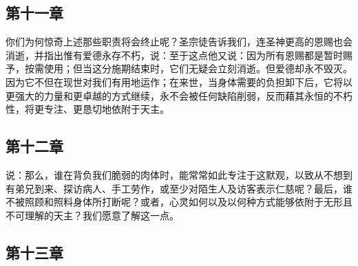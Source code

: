 
\subsection{第十一章}

\par

你们为何惊奇上述那些职责将会终止呢？圣宗徒告诉我们，连圣神更高的恩赐也会消逝，并指出惟有爱德永存不朽，说：至于这点他又说：因为所有恩赐都是暂时赐予，按需使用；但当这分施期结束时，它们无疑会立刻消逝。但爱德却永不毁灭。因为它不但在现世对我们有用地运作；在来世，当身体需要的负担卸下后，它将以更强大的力量和更卓越的方式继续，永不会被任何缺陷削弱，反而藉其永恒的不朽性，将更专注、更恳切地依附于天主。\par


\subsection{第十二章}

\par

说：那么，谁在背负我们脆弱的肉体时，能常常如此专注于这默观，以致从不想到有弟兄到来、探访病人、手工劳作，或至少对陌生人及访客表示仁慈呢？最后，谁不被照顾和照料身体所打断呢？或者，心灵如何以及以何种方式能够依附于无形且不可理解的天主？我们愿意了解这一点。\par


\subsection{第十三章}

\par


